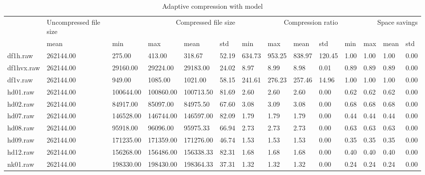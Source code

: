 \begin{table}
\caption{Adaptive compression with model}
\begin{tabular}{llllllllllllll}
 & Uncompressed file size & \multicolumn{4}{r}{Compressed file size} & \multicolumn{4}{r}{Compression ratio} & \multicolumn{4}{r}{Space savings} \\
 & mean & min & max & mean & std & min & max & mean & std & min & max & mean & std \\
df1h.raw & 262144.00 & 275.00 & 413.00 & 318.67 & 52.19 & 634.73 & 953.25 & 838.97 & 120.45 & 1.00 & 1.00 & 1.00 & 0.00 \\
df1hvx.raw & 262144.00 & 29160.00 & 29224.00 & 29183.00 & 24.02 & 8.97 & 8.99 & 8.98 & 0.01 & 0.89 & 0.89 & 0.89 & 0.00 \\
df1v.raw & 262144.00 & 949.00 & 1085.00 & 1021.00 & 58.15 & 241.61 & 276.23 & 257.46 & 14.96 & 1.00 & 1.00 & 1.00 & 0.00 \\
hd01.raw & 262144.00 & 100644.00 & 100860.00 & 100713.50 & 81.69 & 2.60 & 2.60 & 2.60 & 0.00 & 0.62 & 0.62 & 0.62 & 0.00 \\
hd02.raw & 262144.00 & 84917.00 & 85097.00 & 84975.50 & 67.60 & 3.08 & 3.09 & 3.08 & 0.00 & 0.68 & 0.68 & 0.68 & 0.00 \\
hd07.raw & 262144.00 & 146528.00 & 146744.00 & 146597.00 & 82.09 & 1.79 & 1.79 & 1.79 & 0.00 & 0.44 & 0.44 & 0.44 & 0.00 \\
hd08.raw & 262144.00 & 95918.00 & 96096.00 & 95975.33 & 66.94 & 2.73 & 2.73 & 2.73 & 0.00 & 0.63 & 0.63 & 0.63 & 0.00 \\
hd09.raw & 262144.00 & 171235.00 & 171359.00 & 171276.00 & 46.74 & 1.53 & 1.53 & 1.53 & 0.00 & 0.35 & 0.35 & 0.35 & 0.00 \\
hd12.raw & 262144.00 & 156268.00 & 156486.00 & 156338.33 & 82.31 & 1.68 & 1.68 & 1.68 & 0.00 & 0.40 & 0.40 & 0.40 & 0.00 \\
nk01.raw & 262144.00 & 198330.00 & 198430.00 & 198364.33 & 37.31 & 1.32 & 1.32 & 1.32 & 0.00 & 0.24 & 0.24 & 0.24 & 0.00 \\
\end{tabular}
\end{table}
